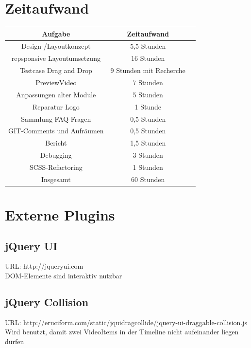 \documentclass[a4paper,10pt]{scrartcl}
\begin{document}
\section{Zeitaufwand}
\begin{tabular}{|c|c|c|}\hline
	\textbf{Aufgabe} & \textbf{Zeitaufwand} \\ \hline
	
	Design-/Layoutkonzept & 5,5 Stunden \\ \hline
	
	repsponsive Layoutumsetzung & 16 Stunden \\ \hline
	
	Testcase Drag and Drop & 9 Stunden mit Recherche \\ \hline
	
	PreviewVideo & 7 Stunden \\ \hline
	
	Anpassungen alter Module & 5 Stunden \\ \hline

	Reparatur Logo & 1 Stunde \\ \hline
	
	Sammlung FAQ-Fragen & 0,5 Stunden \\ \hline
	
	GIT-Comments und Aufräumen & 0,5 Stunden \\ \hline

	Bericht & 1,5 Stunden \\ \hline

	Debugging & 3 Stunden \\ \hline
	
	SCSS-Refactoring & 1 Stunden \\ \hline

	Insgesamt & 60 Stunden \\ \hline

	
 \end{tabular}
 \newpage
\section{Externe Plugins}
\subsection{jQuery UI}
URL: http://jqueryui.com\\
DOM-Elemente sind interaktiv nutzbar
\subsection{jQuery Collision}
URL: http://eruciform.com/static/jquidragcollide/jquery-ui-draggable-collision.js\\
Wird benutzt, damit zwei VideoItems in der Timeline nicht aufeinander liegen dürfen
\end{document}

